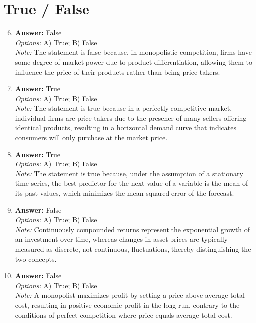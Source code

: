 \documentclass[12pt]{article}
\begin{document}
\section*{True / False}
\begin{enumerate}[label=\arabic*.]
\setcounter{enumi}{5}
\item \textbf{Answer:} False
\\ \textit{Options:} A) True; B) False
\\ \textit{Note:} The statement is false because, in monopolistic competition, firms have some degree of market power due to product differentiation, allowing them to influence the price of their products rather than being price takers.
\item \textbf{Answer:} True
\\ \textit{Options:} A) True; B) False
\\ \textit{Note:} The statement is true because in a perfectly competitive market, individual firms are price takers due to the presence of many sellers offering identical products, resulting in a horizontal demand curve that indicates consumers will only purchase at the market price.
\item \textbf{Answer:} True
\\ \textit{Options:} A) True; B) False
\\ \textit{Note:} The statement is true because, under the assumption of a stationary time series, the best predictor for the next value of a variable is the mean of its past values, which minimizes the mean squared error of the forecast.
\item \textbf{Answer:} False
\\ \textit{Options:} A) True; B) False
\\ \textit{Note:} Continuously compounded returns represent the exponential growth of an investment over time, whereas changes in asset prices are typically measured as discrete, not continuous, fluctuations, thereby distinguishing the two concepts.
\item \textbf{Answer:} False
\\ \textit{Options:} A) True; B) False
\\ \textit{Note:} A monopolist maximizes profit by setting a price above average total cost, resulting in positive economic profit in the long run, contrary to the conditions of perfect competition where price equals average total cost.
\end{enumerate}
\end{document}
